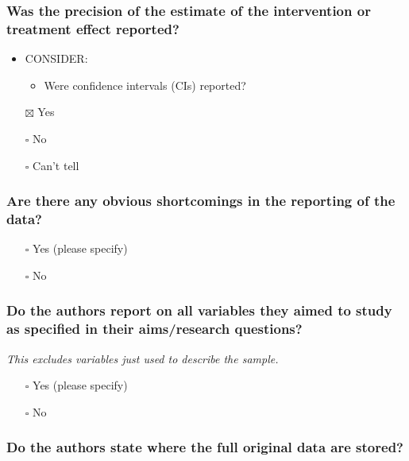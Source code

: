 \documentclass[
  doc, a4paper]{apa7}
\providecommand{\tightlist}{%
  \setlength{\itemsep}{0pt}\setlength{\parskip}{0pt}}
\begin{document}
\subsubsection{Was the precision of the estimate of the intervention or treatment effect reported?}\label{was-the-precision-of-the-estimate-of-the-intervention-or-treatment-effect-reported}

\begin{itemize}
\tightlist
\item
  CONSIDER:

  \begin{itemize}
  \tightlist
  \item
    Were confidence intervals (CIs) reported?
  \end{itemize}
\item[$\boxtimes$]
  Yes
\item[$\square$]
  No
\item[$\square$]
  Can't tell
\end{itemize}

\subsubsection{Are there any obvious shortcomings in the reporting of the data?}\label{are-there-any-obvious-shortcomings-in-the-reporting-of-the-data}

\begin{itemize}
\tightlist
\item[$\square$]
  Yes (please specify)
\item[$\square$]
  No
\end{itemize}

\subsubsection{Do the authors report on all variables they aimed to study as specified in their aims/research questions?}\label{do-the-authors-report-on-all-variables-they-aimed-to-study-as-specified-in-their-aimsresearch-questions}

\emph{This excludes variables just used to describe the sample.}

\begin{itemize}
\tightlist
\item[$\square$]
  Yes (please specify)
\item[$\square$]
  No
\end{itemize}

\subsubsection{Do the authors state where the full original data are stored?}\label{do-the-authors-state-where-the-full-original-data-are-stored}
\end{document}
